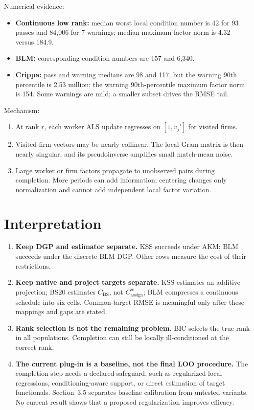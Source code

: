 \documentclass[11pt]{article}
\newcommand{\Cassign}{C^{w}_{\mathrm{assign}}}
\newcommand{\CBS}{C_{\mathrm{BS}}}
\begin{document}
Numerical evidence:
\begin{itemize}
\item \textbf{Continuous low rank:} median worst local condition number is 42
for 93 passes and 84,006 for 7 warnings; median maximum factor norm is 4.32
versus 184.9.
\item \textbf{BLM:} corresponding condition numbers are 157 and 6,340.
\item \textbf{Crippa:} pass and warning medians are 98 and 117, but the warning
90th percentile is 2.53 million; the warning 90th-percentile maximum factor
norm is 154.  Some warnings are mild; a smaller subset drives the RMSE tail.
\end{itemize}

Mechanism:
\begin{enumerate}
\item At rank $r$, each worker ALS update regresses on $[1,v_j']$ for visited
firms.
\item Visited-firm vectors may be nearly collinear.  The local Gram matrix is
then nearly singular, and its pseudoinverse amplifies small match-mean noise.
\item Large worker or firm factors propagate to unobserved pairs during
completion.  More periods can add information; centering changes only
normalization and cannot add independent local factor variation.
\end{enumerate}

\section{Interpretation}

\begin{enumerate}
\item \textbf{Keep DGP and estimator separate.} KSS succeeds under AKM; BLM
succeeds under the discrete BLM DGP.  Other rows measure the cost of their
restrictions.
\item \textbf{Keep native and project targets separate.} KSS estimates an
additive projection; BS20 estimates $\CBS$, not $\Cassign$; BLM compresses a
continuous schedule into six cells.  Common-target RMSE is meaningful only
after these mappings and gaps are stated.
\item \textbf{Rank selection is not the remaining problem.} BIC selects the
true rank in all populations.  Completion can still be locally ill-conditioned
at the correct rank.
\item \textbf{The current plug-in is a baseline, not the final LOO procedure.}
The completion step needs a declared safeguard, such as regularized local
regressions, conditioning-aware support, or direct estimation of target
functionals.  Section~3.5 separates baseline calibration from untested
variants.  No current result shows that a proposed regularization improves
efficacy.
\end{enumerate}
\end{document}
